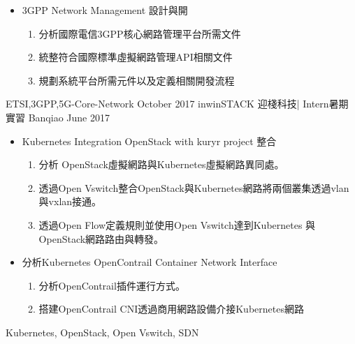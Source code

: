 \begin{experiences}
{                      \begin{itemize}
                        \item 3GPP Network Management 設計與開
                        \begin{enumerate}
                        	\item 分析國際電信3GPP核心網路管理平台所需文件
                            \item 統整符合國際標準虛擬網路管理API相關文件
                            \item 規劃系統平台所需元件以及定義相關開發流程
                        \end{enumerate}
                      \end{itemize}
                    }
                    {ETSI,3GPP,5G-Core-Network}
\emptySeparator
  \experience
    {October 2017}     { inwinSTACK 迎棧科技| Intern}{暑期實習}
    {Banqiao}
    {June 2017}    {
                      \begin{itemize}
                        \item Kubernetes Integration OpenStack with kuryr project 整合
                        \begin{enumerate}
                        	\item 分析 OpenStack虛擬網路與Kubernetes虛擬網路異同處。
                            \item 透過Open Vswitch整合OpenStack與Kubernetes網路將兩個叢集透過vlan與vxlan接通。
                            \item 透過Open Flow定義規則並使用Open Vswitch達到Kubernetes 與OpenStack網路路由與轉發。
                        \end{enumerate}
                        \item 分析Kubernetes OpenContrail Container Network Interface
                        \begin{enumerate}
                        	\item 分析OpenContrail插件運行方式。
                            \item 搭建OpenContrail CNI透過商用網路設備介接Kubernetes網路
                        \end{enumerate}
                      \end{itemize}
                    }
                    {Kubernetes, OpenStack, Open Vswitch, SDN}
  \emptySeparator
\end{experiences}
